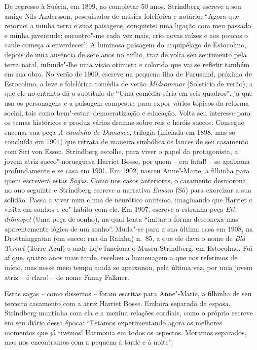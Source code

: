 De regresso à Suécia, em 1899, ao completar 50 anos, Strindberg escreve
a seu amigo Nils Andersson, pesquisador de música folclórica e notário:
``Agora que retornei a minha terra e suas paisagens, conquistei uma
ligação com meu passado e minha juventude; encontro"-me cada vez mais,
crio novas raízes e aos poucos o caule começa a enverdecer''. A luminosa
paisagem do arquipélago de Estocolmo, depois de uma ausência de sete
anos no exílio, traz de volta seu sentimento pela terra natal,
infunde"-lhe uma visão otimista e colorida que vai se refletir também
em sua obra. No verão de 1900, escreve na pequena ilha de Furusund,
próxima de Estocolmo, a leve e folclórica comédia de verão
\textit{Midsommar} (Solstício de verão), a que ele no entanto dá o
subtítulo de ``Uma comédia séria em seis quadros'', já que usa os
personagens e a paisagem campestre para expor vários tópicos da reforma
social, tais como bem"-estar, democratização e educação. Volta seu
interesse para os temas históricos e produz vários dramas sobre reis e
heróis suecos. Consegue encenar sua peça \textit{A caminho de Damasco},
trilogia (iniciada em 1898, mas só concluída em 1904) que retrata de
maneira simbólica os lances de seu casamento com Siri von Essen.
Strindberg escolhe, para viver o papel da protagonista, a jovem atriz
sueco"-norueguesa Harriet Bosse, por quem -- era fatal! -- se apaixona
profundamente e se casa em 1901. Em 1902, nasceu Anne"-Marie, a
filhinha para quem escreverá estas \textit{Sagas}. Como nos casos
anteriores, o casamento desmorona no ano seguinte e Strindberg escreve
a narrativa \textit{Ensam} (Só) para exorcizar a sua solidão.  Passa a
viver num clima de neurótico onirismo, imaginando que Harriet o visita
em sonhos e co"-habita com ele. Em 1907, escreve a estranha peça
\textit{Ett drömspel} (Uma peça de sonho), na qual tenta ``imitar a
forma desconexa mas aparentemente lógica de um sonho''. Muda"-se para a
sua última casa em 1908, na Drottninggatan (em sueco: rua da Rainha) 
n.~85, a que ele dava o nome de \textit{Bl\r a Tornet} (Torre Azul) e onde
hoje funciona o Museu Strindberg, em Estocolmo. Foi aí que, quatro anos
mais tarde, recebeu a homenagem a que nos referimos de início, mas
nesse meio tempo ainda se apaixonou, pela última vez, por uma jovem
atriz -- é claro! -- de nome Fanny Falkner.
\asterisc

Estas sagas -- como dissemos -- foram escritas para Anne"-Marie, a
filhinha de seu terceiro casamento com a atriz Harriet Bosse. Embora
separado da esposa, Strindberg mantinha com ela e a menina relações
cordiais, como o  próprio escreve em seu diário dessa época: ``Estamos
experimentando agora os melhores momentos que já tivemos! Harmonia em
todos os aspectos. Moramos separados, mas nos encontramos com a pequena
à tarde e à noite''.

